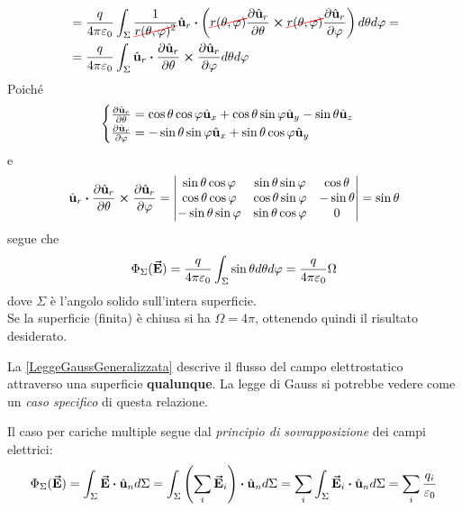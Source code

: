 \begin{demonstration}
\begin{align*}
	&=\frac{q}{4\pi\epsilon_0}\int_{\Sigma}\frac{1}{\Ccancel[red]{r(\theta,\phi)^2}}\vbh{u}_r\vdot\left(\Ccancel[red]{r(\theta,\phi)}\pdv{\vbh{u}_r}{\theta}\cross \Ccancel[red]{r(\theta,\phi)}\pdv{\vbh{u}_r}{\phi}\right)d\theta d\phi=\\
	&=\frac{q}{4\pi\epsilon_0}\int_{\Sigma}\vbh{u}_r\vdot\pdv{\vbh{u}_r}{\theta}\cross\pdv{\vbh{u}_r}{\phi}d\theta d\phi
\end{align*}
Poiché
\begin{equation*}
	\begin{cases}
		\pdv{\hat{\mathbf{u}}_r}{\theta}=\cos\theta\cos\varphi\hat{\mathbf{u}}_x+\cos\theta\sin\varphi\hat{\mathbf{u}}_y-\sin\theta\hat{\mathbf{u}}_z\\
		\pdv{\hat{\mathbf{u}}_r}{\varphi}=-\sin\theta\sin\varphi\hat{\mathbf{u}}_x+\sin\theta\cos\varphi\hat{\mathbf{u}}_y\\
\end{cases}
\end{equation*}
e
\begin{equation*}
	\vbh{u}_r\vdot\pdv{\vbh{u}_r}{\theta}\cross\pdv{\vbh{u}_r}{\phi}=\begin{vmatrix}
		\sin\theta\cos\phi & \sin\theta\sin\phi & \cos\theta\\
		\cos\theta\cos\phi & \cos\theta\sin\phi & -\sin\theta\\
		-\sin\theta\sin\phi & \sin\theta\cos\phi & 0
	\end{vmatrix}=\sin\theta
\end{equation*}
segue che
\begin{equation}
	\Phi_{\Sigma}(\vb*{\va{E}})=\frac{q}{4\pi\varepsilon_0}\int_{\Sigma}\sin\theta d\theta d\varphi=\frac{q}{4\pi\varepsilon_0}\Omega\label{LeggeGaussGeneralizzata}
\end{equation}
dove $\Sigma$ è l'angolo solido sull'intera superficie.\\
Se la superficie (finita) è chiusa si ha $\Omega=4\pi$, ottenendo quindi il risultato desiderato.
\end{demonstration}
\begin{observe}
	La \eqref{LeggeGaussGeneralizzata} descrive il flusso del campo elettrostatico attraverso una superficie \textbf{qualunque}. La legge di Gauss si potrebbe vedere come un \textit{caso specifico} di questa relazione.
\end{observe}
Il caso per cariche multiple segue dal \textit{principio di sovrapposizione} dei campi elettrici:
\begin{equation*}
	\Phi_{\Sigma}(\vba{E})=\int_{\Sigma} \vba{E}\vdot \vbh{u}_nd\Sigma=\int_{\Sigma}\left(\sum_i\vba{E}_i\right)\vdot\vbh{u}_nd\Sigma=\sum_i\int_{\Sigma}\vba{E}_i\vdot\vbh{u}_nd\Sigma=\sum_i\frac{q_i}{\epsilon_0}
\end{equation*}
